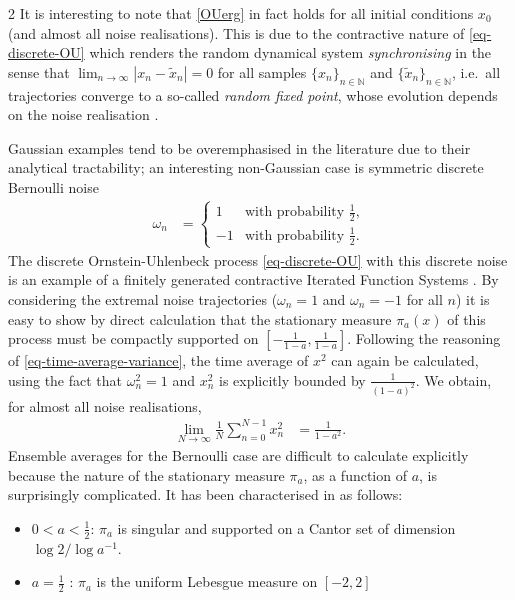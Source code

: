 \documentclass[11pt]{article}
\begin{document}
\begin{multicols}{2}
It is interesting to note that \eqref{OUerg} in fact holds for all initial conditions $x_0$ (and almost all noise realisations). This is due to the contractive nature of \eqref{eq-discrete-OU} which renders the random dynamical system \emph{synchronising} in the sense that $\lim_{n\to\infty}|x_n-\tilde{x}_n|=0$ for all samples $\{x_n\}_{n\in\mathbb{N}}$ and $\{\tilde{x}_n\}_{n\in\mathbb{N}}$, i.e.\ all trajectories converge to a so-called \emph{random fixed point}, whose evolution depends on the noise realisation \cite{Arnold1998}. 

Gaussian examples tend to be overemphasised in the literature due to their analytical tractability; an interesting non-Gaussian case is symmetric discrete Bernoulli noise
\begin{align}
\omega_n &= \left\{
\begin{array}{ll}
1 & \text{with probability $\frac{1}{2}$},\\
-1 & \text{with probability $\frac{1}{2}$}.
\end{array}
\right.
\end{align}
The discrete Ornstein-Uhlenbeck process \eqref{eq-discrete-OU} with this discrete noise is an example of a finitely generated contractive Iterated Function Systems \cite{barnsley1988fractals}.
By considering the extremal noise trajectories ($\omega_n=1$ and $\omega_n=-1$ for all $n$) it is easy to show by direct calculation that the stationary measure $\pi_a(x)$  of this process must be compactly supported on $\left[ -\frac{1}{1-a}, \frac{1}{1-a} \right]$.
Following the reasoning of \eqref{eq-time-average-variance}, the time average of $x^2$ can again be calculated, using the fact that
$\omega_n^2 = 1$  and $x_n^2$ is explicitly bounded by $\frac{1}{(1-a)^2}$.
We obtain, for almost all noise realisations,
\begin{align}
\label{eq-time-average-variance-Bernoullli-noise}
\lim_{N\to\infty} \frac{1}{N}\sum_{n=0}^{N-1}x_n^2 &= \frac{1}{1-a^2}.
\end{align}
Ensemble averages for the Bernoulli case are difficult to calculate explicitly because the nature of the stationary measure $\pi_a$, as a function of $a$, is surprisingly complicated.
It has been characterised in \cite{solomyak1995random} as follows:
\begin{itemize}
\item $ 0< a < \frac{1}{2}$:  $\pi_a$ is singular and supported on a Cantor set of dimension $\log 2 / \log a^{-1}$.
\item $a = \frac{1}{2}$ :  $\pi_a$ is the uniform Lebesgue measure on $\left[-2,2\right]$

\end{itemize}
\end{multicols}
\end{document}
